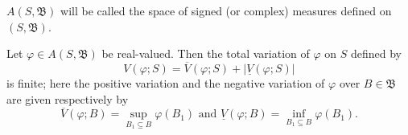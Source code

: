 $A(S, \mathfrak{B})$ will be called the space of signed (or complex) measures defined on $(S, \mathfrak{B})$. 

\begin{lemma}\label{lem:I.3.Lemma.2} Let $\varphi \in A(S, \mathfrak{B})$ be real-valued. Then the total variation of $\varphi$ on $S$ defined by 
\begin{equation}\label{eq:I.3.9}
V (\varphi ; S) = \overline {{V}} (\varphi ; S) + | \underline {{V}} (\varphi ; S) |
\end{equation}
is finite; here the positive variation and the negative variation of $\varphi$ over $B\in\mathfrak{B}$ are given respectively by 
\begin{equation}\label{eq:I.3.10}
\overline {{V}} (\varphi ; B) = \sup\limits_ {B_{1} \subseteq B} \varphi (B_{1}) \text{ and } \underline {{V}} (\varphi ; B) = \inf\limits_ {B_{1} \subseteq B} \varphi (B_{1}).
\end{equation}
\end{lemma}


